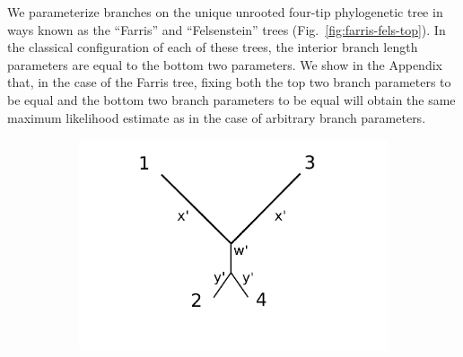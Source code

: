 \documentclass{article}
\begin{document}
We parameterize branches on the unique unrooted four-tip phylogenetic tree in ways known as the ``Farris'' and ``Felsenstein'' trees (Fig.~\ref{fig:farris-fels-top}).
In the classical configuration of each of these trees, the interior branch length parameters are equal to the bottom two parameters.
We show in the Appendix that, in the case of the Farris tree, fixing both the top two branch parameters to be equal and the bottom two branch parameters to be equal will obtain the same maximum likelihood estimate as in the case of arbitrary branch parameters.

\begin{figure}
\centering
\begin{subfigure}{.45\linewidth}
\centering
\includegraphics[width=.95\textwidth]{farris_blank}

\end{subfigure}
\end{figure}
\end{document}
